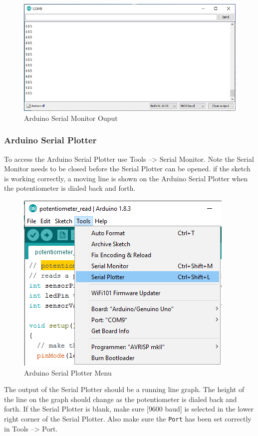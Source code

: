 \documentclass{book}
\makeatletter
\def\maxwidth{\ifdim\Gin@nat@width>\linewidth\linewidth
    \else\Gin@nat@width\fi}
\let\Oldincludegraphics\includegraphics
\renewcommand{\includegraphics}[1]{\Oldincludegraphics[width=.8\maxwidth]{#1}}
\makeatother
\begin{document}
\begin{figure}
\centering
\includegraphics{images/serial_monitor_output.png}
\caption{Arduino Serial Monitor Ouput}
\end{figure}

    \subsubsection{Arduino Serial Plotter}\label{arduino-serial-plotter}

To access the Arduino Serial Plotter use Tools --\textgreater{} Serial
Monitor. Note the Serial Monitor needs to be closed before the Serial
Plotter can be opened. if the sketch is working correctly, a moving line
is shown on the Arduino Serial Plotter when the potentiometer is dialed
back and forth.

\begin{figure}
\centering
\includegraphics{images/Tools_SerialPlotter.png}
\caption{Arduino Serial Plotter Menu}
\end{figure}

The output of the Serial Plotter should be a running line graph. The
height of the line on the graph should change as the potentiometer is
dialed back and forth. If the Serial Plotter is blank, make sure {[}9600
baud{]} is selected in the lower right corner of the Serial Plotter.
Also make sure the \lstinline!Port! has been set correctly in Tools
--\textgreater{} Port.
\end{document}
